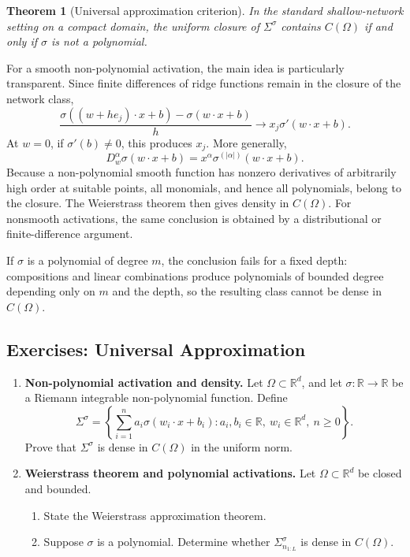 \documentclass[11pt,a4paper]{article}
\theoremstyle{definition}
\theoremstyle{plain}
\newtheorem{theorem}{Theorem}[section]
\theoremstyle{remark}
\theoremstyle{plain}
\begin{document}
\begin{theorem}[Universal approximation criterion]
In the standard shallow-network setting on a compact domain, the uniform closure of $\Sigma^\sigma$ contains $C(\Omega)$ if and only if $\sigma$ is not a polynomial.
\end{theorem}

For a smooth non-polynomial activation, the main idea is particularly transparent. Since finite differences of ridge functions remain in the closure of the network class,
\[
  \frac{\sigma((w+he_j)\cdot x+b)-\sigma(w\cdot x+b)}{h}
  \longrightarrow x_j\sigma'(w\cdot x+b).
\]
At $w=0$, if $\sigma'(b)\neq0$, this produces $x_j$. More generally,
\[
  D_w^\alpha\sigma(w\cdot x+b)=x^\alpha\sigma^{(|\alpha|)}(w\cdot x+b).
\]
Because a non-polynomial smooth function has nonzero derivatives of arbitrarily high order at suitable points, all monomials, and hence all polynomials, belong to the closure. The Weierstrass theorem then gives density in $C(\Omega)$. For nonsmooth activations, the same conclusion is obtained by a distributional or finite-difference argument.

If $\sigma$ is a polynomial of degree $m$, the conclusion fails for a fixed depth: compositions and linear combinations produce polynomials of bounded degree depending only on $m$ and the depth, so the resulting class cannot be dense in $C(\Omega)$.



\subsection*{Exercises: Universal Approximation}
\begin{enumerate}[label=\textbf{Exercise \arabic*.},leftmargin=2.6em]
  \item \textbf{Non-polynomial activation and density.}
  Let $\Omega\subset\mathbb R^d$, and let $\sigma:\mathbb R\to\mathbb R$ be a Riemann integrable non-polynomial function. Define
  \[
    \Sigma^\sigma
    =\left\{
      \sum_{i=1}^n a_i\sigma(w_i\cdot x+b_i):
      a_i,b_i\in\mathbb R,
      \ w_i\in\mathbb R^d,
      \ n\ge0
    \right\}.
  \]
  Prove that $\Sigma^\sigma$ is dense in $C(\Omega)$ in the uniform norm.

  \item \textbf{Weierstrass theorem and polynomial activations.}
  Let $\Omega\subset\mathbb R^d$ be closed and bounded.
  \begin{enumerate}[label=(\alph*)]
    \item State the Weierstrass approximation theorem.
    \item Suppose $\sigma$ is a polynomial. Determine whether $\Sigma^\sigma_{n_{1:L}}$ is dense in $C(\Omega)$.
  \end{enumerate}
\end{enumerate}
\end{document}
